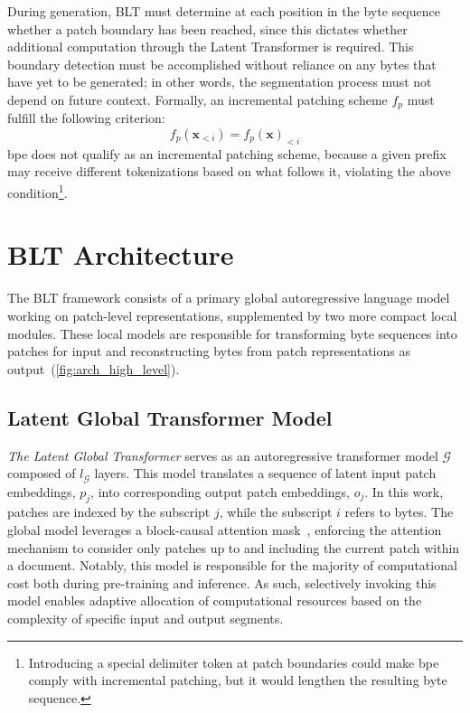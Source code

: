 During generation, {\textsc BLT} must determine at each position in the byte sequence whether a patch boundary has been reached, since this dictates whether additional computation through the Latent Transformer is required. This boundary detection must be accomplished without reliance on any bytes that have yet to be generated; in other words, the segmentation process must not depend on future context. Formally, an incremental patching scheme $f_p$ must fulfill the following criterion:
$$f_p(\pmb{x}_{<i}) = f_p(\pmb{x})_{<i}$$
bpe does not qualify as an incremental patching scheme, because a given prefix may receive different tokenizations based on what follows it, violating the above condition\footnote{Introducing a special delimiter token at patch boundaries could make bpe comply with incremental patching, but it would lengthen the resulting byte sequence.}.

\section{{\textsc BLT} Architecture}
\label{section:architecture}
The {\textsc BLT} framework consists of a primary global autoregressive language model working on patch-level representations, supplemented by two more compact local modules. These local models are responsible for transforming byte sequences into patches for input and reconstructing bytes from patch representations as output~(\autoref{fig:arch_high_level}).

\subsection{Latent Global Transformer Model}

\textit{The Latent Global Transformer} serves as an autoregressive transformer model $\mathcal{G}$ composed of $l_{\mathcal{G}}$ layers. This model translates a sequence of latent input patch embeddings, $p_j$, into corresponding output patch embeddings, $o_j$. In this work, patches are indexed by the subscript $j$, while the subscript $i$ refers to bytes. The global model leverages a block-causal attention mask~\citep{dubey2024llama}, enforcing the attention mechanism to consider only patches up to and including the current patch within a document. Notably, this model is responsible for the majority of computational cost both during pre-training and inference. As such, selectively invoking this model enables adaptive allocation of computational resources based on the complexity of specific input and output segments.


